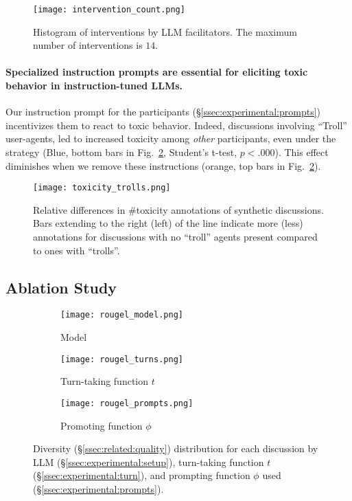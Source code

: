 \begin{figure}[t]
	\centering
	\texttt{[image: intervention\_count.png]}
	\caption{Histogram of interventions by \ac{LLM} facilitators. The maximum number of interventions is $14$.}
	\label{fig:intervention_count}
\end{figure}

\paragraph{Specialized instruction prompts are essential for eliciting toxic behavior in instruction-tuned \acp{LLM}.} Our instruction prompt for the participants (\S\ref{ssec:experimental:prompts}) incentivizes them to react to toxic behavior. Indeed, discussions involving “Troll” user-agents, led to increased toxicity among \emph{other} participants, even under the \emph{\strategynoinstr} strategy (Blue, bottom bars in Fig.~\ref{fig:toxicity_trolls}, Student's t-test, $p < .000$). This effect diminishes when we remove these instructions (orange, top bars in Fig.~\ref{fig:toxicity_trolls}).

\begin{figure}[t]
    \centering
    \texttt{[image: toxicity\_trolls.png]}
    \caption{Relative differences in \#toxicity annotations of synthetic discussions. Bars extending to the right (left) of the line indicate more (less) annotations for discussions with no ``troll'' agents present compared to ones with ``trolls''.}
    \label{fig:toxicity_trolls}
\end{figure}


\subsection{Ablation Study}
\label{ssec:results:ablation}

\begin{figure*}[t]
    \begin{subfigure}{0.32\linewidth}
        \texttt{[image: rougel\_model.png]}
        \caption{Model}
        \label{fig:rougel_model}
    \end{subfigure}%
    \hfill
    \begin{subfigure}{0.32\linewidth}
        \texttt{[image: rougel\_turns.png]}
        \caption{Turn-taking function $t$}
        \label{fig:rougel_turns}
    \end{subfigure}%
    \hfill
    \begin{subfigure}{0.32\linewidth}
        \texttt{[image: rougel\_prompts.png]}
        \caption{Promoting function $\phi$}
        \label{fig:rougel_prompts}
    \end{subfigure}%

    \caption{Diversity (\S\ref{ssec:related:quality}) distribution for each discussion by \ac{LLM} (\S\ref{ssec:experimental:setup}), turn-taking function $t$ (\S\ref{ssec:experimental:turn}), and prompting function $\phi$ used (\S\ref{ssec:experimental:prompts}).}
    \label{fig:diversity}
\end{figure*}

